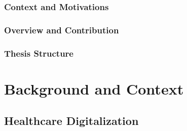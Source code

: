 \documentclass[12pt,a4paper,openright,twoside]{book}
\begin{document}
\tableofcontents   
\listoffigures     %
\lstlistoflistings %

\mainmatter

\label{chap:introduction}
\section*{Context and Motivations}

\section*{Overview and Contribution}

\section*{Thesis Structure}


\nocite{2pkt-jelia2021}


\part{Background and Context}

\chapter{Healthcare Digitalization}
\label{chap:back:Healthcare}

\end{document}
